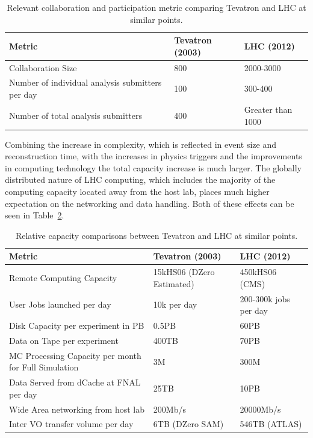 \begin{table}[t]
\begin{center}
\begin{tabular}{lll}
Metric & Tevatron (2003) & LHC (2012) \\ \hline
Collaboration Size & 800 & 2000-3000 \\
Number of individual analysis submitters per day & 100 & 300-400 \\
Number of total analysis submitters & 400 & Greater than 1000 \\ \hline
\end{tabular}
\caption{Relevant collaboration and participation metric comparing Tevatron and LHC at similar points.}
\label{tab:compare_coll}
\end{center}
\end{table}

Combining the increase in complexity, which is reflected in event size
and reconstruction time, with the increases in physics triggers and
the improvements in computing technology the total capacity increase
is much larger.  The globally distributed nature of LHC computing,
which includes the majority of the computing capacity located away
from the host lab, places much higher expectation on the networking
and data handling.  Both of these effects can be seen in
Table~\ref{tab:compare_comp}.

\begin{table}[t]
\begin{center}
\begin{tabular}{lll}
Metric & Tevatron (2003) & LHC (2012) \\ \hline
Remote Computing Capacity & 15kHS06 (DZero Estimated) & 450kHS06 (CMS) \\
User Jobs launched per day & 10k per day & 200-300k jobs per day \\
Disk Capacity per experiment in PB & 0.5PB & 60PB \\
Data on Tape per experiment  & 400TB & 70PB \\
MC Processing Capacity per month for Full Simulation & 3M & 300M \\
Data Served from dCache at FNAL per day & 25TB & 10PB \\
Wide Area networking from host lab & 200Mb/s & 20000Mb/s \\
Inter VO transfer volume per day & 6TB (DZero SAM) & 546TB (ATLAS) \\ \hline
\end{tabular}
\caption{Relative capacity comparisons between Tevatron and LHC at similar points.}
\label{tab:compare_comp}
\end{center}
\end{table}


